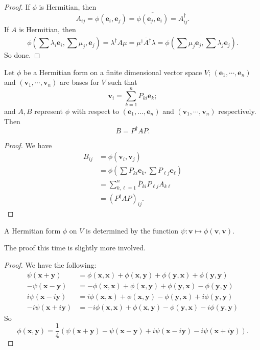 \documentclass[a4paper]{article}
\begin{document}
\begin{proof}
  If $\phi$ is Hermitian, then
  \[
    A_{ij} = \phi(\mathbf{e}_i, \mathbf{e}_j) = \overline{\phi(\mathbf{e}_j, \mathbf{e}_i)} = A^{\dagger}_{ij}.
  \]
  If $A$ is Hermitian, then
  \[
    \phi\left(\sum \lambda_i \mathbf{e}_i, \sum \mu_j, \mathbf{e}_j\right) = \lambda^\dagger A \mu = \overline{\mu^\dagger A^\dagger \lambda} = \overline{\phi\left(\sum \mu_j \mathbf{e}_j, \sum \lambda_j \mathbf{e}_j\right)}.
  \]
  So done.
\end{proof}

\begin{prop}
  Let $\phi$ be a Hermitian form on a finite dimensional vector space $V$; $(\mathbf{e}_1, \cdots, \mathbf{e}_n)$ and $(\mathbf{v}_1, \cdots, \mathbf{v}_n)$ are bases for $V$ such that
  \[
    \mathbf{v}_i = \sum_{k = 1}^n P_{ki} \mathbf{e}_k;
  \]
  and $A, B$ represent $\phi$ with respect to $(\mathbf{e}_1, \ldots, \mathbf{e}_n)$ and $(\mathbf{v}_1, \cdots, \mathbf{v}_n)$ respectively. Then
  \[
    B = P^\dagger AP.
  \]
\end{prop}

\begin{proof}
  We have
  \begin{align*}
    B_{ij} &= \phi(\mathbf{v}_i, \mathbf{v}_j) \\
    &= \phi\left(\sum P_{ki} \mathbf{e}_k, \sum P_{\ell j} \mathbf{e}_\ell\right)\\
    &= \sum_{k, \ell = 1}^n \bar{P}_{ki} P_{\ell j} A_{k\ell}\\
    &= (P^\dagger AP)_{ij}.
  \end{align*}
\end{proof}

\begin{lemma}
  A Hermitian form $\phi$ on $V$ is determined by the function $\psi: \mathbf{v} \mapsto \phi(\mathbf{v}, \mathbf{v})$.
\end{lemma}

The proof this time is slightly more involved.
\begin{proof}
  We have the following:
  \begin{align*}
    \psi(\mathbf{x} + \mathbf{y}) &= \phi(\mathbf{x}, \mathbf{x}) + \phi(\mathbf{x}, \mathbf{y}) + \phi(\mathbf{y}, \mathbf{x}) + \phi(\mathbf{y}, \mathbf{y})\\
   -\psi(\mathbf{x} - \mathbf{y}) &= -\phi(\mathbf{x}, \mathbf{x}) + \phi(\mathbf{x}, \mathbf{y}) + \phi(\mathbf{y}, \mathbf{x}) - \phi(\mathbf{y}, \mathbf{y})\\
   i\psi(\mathbf{x} -i\mathbf{y}) &= i\phi(\mathbf{x}, \mathbf{x}) + \phi(\mathbf{x}, \mathbf{y}) - \phi(\mathbf{y}, \mathbf{x}) +i\phi(\mathbf{y}, \mathbf{y})\\
  -i\psi(\mathbf{x} +i\mathbf{y}) &=-i\phi(\mathbf{x}, \mathbf{x}) + \phi(\mathbf{x}, \mathbf{y}) - \phi(\mathbf{y}, \mathbf{x}) -i\phi(\mathbf{y}, \mathbf{y})
  \end{align*}
  So
  \[
    \phi(\mathbf{x}, \mathbf{y}) = \frac{1}{4}(\psi(\mathbf{x} + \mathbf{y}) - \psi(\mathbf{x} - \mathbf{y}) + i\psi(\mathbf{x} - i\mathbf{y}) - i \psi(\mathbf{x} + i\mathbf{y})).
  \]
\end{proof}
\end{document}

